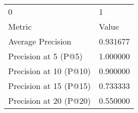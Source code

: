 \begin{tabular}{ll}
0 & 1 \\
Metric & Value \\
Average Precision & 0.931677 \\
Precision at 5 (P@5) & 1.000000 \\
Precision at 10 (P@10) & 0.900000 \\
Precision at 15 (P@15) & 0.733333 \\
Precision at 20 (P@20) & 0.550000 \\
\end{tabular}

